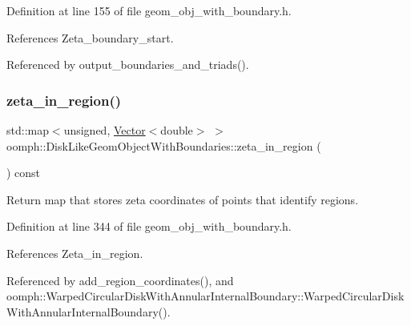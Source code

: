 Definition at line 155 of file geom\+\_\+obj\+\_\+with\+\_\+boundary.\+h.



References Zeta\+\_\+boundary\+\_\+start.



Referenced by output\+\_\+boundaries\+\_\+and\+\_\+triads().

\mbox{\label{classoomph_1_1DiskLikeGeomObjectWithBoundaries_a5573c14a4a2faeb62b4710c799397604}} 
\subsubsection{\texorpdfstring{zeta\+\_\+in\+\_\+region()}{zeta\_in\_region()}}
{\footnotesize\ttfamily std\+::map$<$unsigned, \hyperlink{classoomph_1_1Vector}{Vector}$<$double$>$ $>$ oomph\+::\+Disk\+Like\+Geom\+Object\+With\+Boundaries\+::zeta\+\_\+in\+\_\+region (\begin{DoxyParamCaption}{ }\end{DoxyParamCaption}) const\hspace{0.3cm}{\ttfamily [inline]}}



Return map that stores zeta coordinates of points that identify regions. 



Definition at line 344 of file geom\+\_\+obj\+\_\+with\+\_\+boundary.\+h.



References Zeta\+\_\+in\+\_\+region.



Referenced by add\+\_\+region\+\_\+coordinates(), and oomph\+::\+Warped\+Circular\+Disk\+With\+Annular\+Internal\+Boundary\+::\+Warped\+Circular\+Disk\+With\+Annular\+Internal\+Boundary().

\mbox{\label{classoomph_1_1DiskLikeGeomObjectWithBoundaries_abed6833ebbafddb809ae8d209808c904}} 
